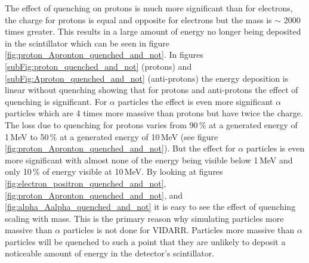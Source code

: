 The effect of quenching on protons is much more significant than for electrons, the charge for protons is equal and opposite for electrons but the mass is $\sim$ 2000 times greater. This results in a large amount of energy no longer being deposited in the scintillator which can be seen in figure \ref{fig:proton_Apronton_quenched_and_not}. In figures \ref{subFig:proton_quenched_and_not} (protons) and \ref{subFig:Aproton_quenched_and_not} (anti-protons) the energy deposition is linear without quenching showing that for protons and anti-protons the effect of quenching is significant. For $\alpha$ particles the effect is even more significant $\alpha$ particles which are 4 times more massive than protons but have twice the charge. The loss due to quenching for protons varies from 90\,\% at a generated energy of 1\,MeV to 50\,\% at a generated energy of 10\,MeV (see figure \ref{fig:proton_Apronton_quenched_and_not}). But the effect for $\alpha$ particles is even more significant with almost none of the energy being visible below 1\,MeV and only 10\,\% of energy visible at 10\,MeV. By looking at figures \ref{fig:electron_positron_quenched_and_not}, \ref{fig:proton_Apronton_quenched_and_not}, and \ref{fig:alpha_Aalpha_quenched_and_not} it is easy to see the effect of quenching scaling with mass. This is the primary reason why simulating particles more massive than $\alpha$ particles is not done for VIDARR. Particles more massive than $\alpha$ particles will be quenched to such a point that they are unlikely to deposit a noticeable amount of energy in the detector's scintillator. 

